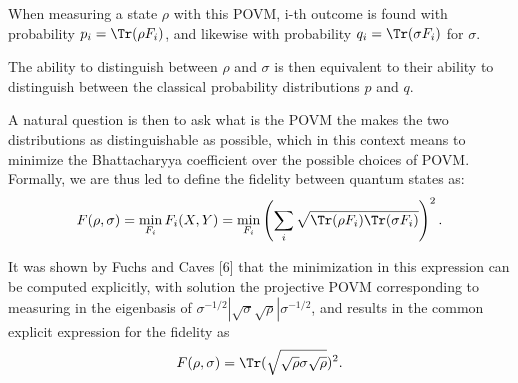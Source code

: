 When measuring a state $\rho$ with this POVM, i-th outcome is found with probability $p_i=\Tr(\rho F_i)$, and likewise with probability $q_i=\Tr(\sigma F_i)$ for $\sigma$. 

The ability to distinguish between $\rho$ and $\sigma$ is then equivalent to their ability to distinguish between the classical probability distributions $p$ and $q$. 

A natural question is then to ask what is the POVM the makes the two distributions as distinguishable as possible, which in this context means to minimize the Bhattacharyya coefficient over the possible choices of POVM. Formally, we are thus led to define the fidelity between quantum states as:
\begin{equation}
F(\rho, \sigma) = \min_{F_i}F_i(X, Y)=\min_{F_i}\left(\sum_i \sqrt{\Tr(\rho F_i)\Tr(\sigma F_i)}\right)^2.
\end{equation}

It was shown by Fuchs and Caves [6] that the minimization in this expression can be computed explicitly, with solution the projective POVM corresponding to measuring in the eigenbasis of $\sigma^{-1/2}|\sqrt{\sigma}\sqrt{\rho}|\sigma^{-1/2}$, and results in the common explicit expression for the fidelity as
\begin{equation}
F(\rho, \sigma) = \Tr(\sqrt{\sqrt{\rho}\sigma\sqrt{\rho}})^{2}.
\end{equation}
